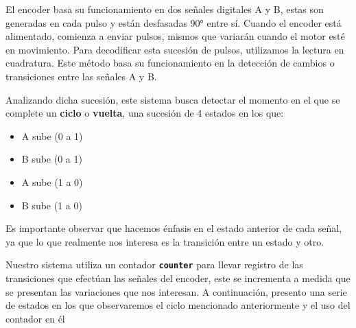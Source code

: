                 \label{fde}
                
                    El encoder basa su funcionamiento en dos señales digitales A y B, estas son generadas en cada pulso y están desfasadas 90° entre sí. Cuando el encoder está alimentado, comienza a enviar pulsos, mismos que variarán cuando el motor esté en movimiento. Para decodificar esta sucesión de pulsos, utilizamos la lectura en cuadratura. Este método basa su funcionamiento en la detección de cambios o transiciones entre las señales A y B.\par
                    Analizando dicha sucesión, este sistema busca detectar el momento en el que se complete un \textbf{ciclo} o \textbf{vuelta}, una sucesión de 4 estados en los que:\par
                    
                    \begin{itemize} [label=•]
                        \setlength{\itemindent}{1.5em}
                        
                        \item A sube (0 a 1)
                        \item B sube (0 a 1)
                        \item A sube (1 a 0)
                        \item B sube (1 a 0)
                    \end{itemize}
                    
                    Es importante observar que hacemos énfasis en el estado anterior de cada señal, ya que lo que realmente nos interesa es la transición entre un estado y otro.\par
                    Nuestro sistema utiliza un contador \texttt{\textbf{counter}} para llevar registro de las transiciones que efectúan las señales del encoder, este se incrementa a medida que se presentan las variaciones que nos interesan. A continuación, presento una serie de estados en los que observaremos el ciclo mencionado anteriormente y el uso del contador en él\par

